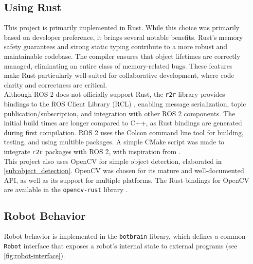 \subsection{Using Rust}
This project is primarily implemented in Rust. While this choice was primarily based on developer preference, it brings several notable benefits. Rust's memory safety guarantees and strong static typing contribute to a more robust and maintainable codebase. The compiler ensures that object lifetimes are correctly managed, eliminating an entire class of memory-related bugs. These features make Rust particularly well-suited for collaborative development, where code clarity and correctness are critical. \\

Although ROS 2 does not officially support Rust, the \texttt{r2r} library \cite{r2r} provides bindings to the ROS Client Library (RCL) \cite{rcl}, enabling message serialization, topic publication/subscription, and integration with other ROS 2 components. The initial build times are longer compared to C++, as Rust bindings are generated during first compilation. ROS 2 uses the Colcon command line tool \cite{colcon} for building, testing, and using multible packages. A simple CMake script was made to integrate \texttt{r2r} packages with ROS 2, with inspiration from \cite{r2r-minimal-node}. \\

This project also uses OpenCV \cite{opencv} for simple object detection, elaborated in \cref{sub:object_detection}. OpenCV was chosen for its mature and well-documented API, as well as its support for multiple platforms. The Rust bindings for OpenCV are available in the \texttt{opencv-rust} library \cite{opencv-rust}.


\subsection{Robot Behavior}
Robot behavior is implemented in the \texttt{botbrain} library, which defines a common \texttt{Robot} interface that exposes a robot’s internal state to external programs (see \cref{fig:robot-interface}).

